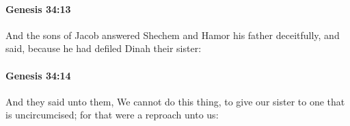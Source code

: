 		\paragraph{Genesis 34:13} %
			\label{GENESIS-34-13}

			And the sons of Jacob answered Shechem and Hamor his father deceitfully, and said, because he had defiled Dinah their sister:


		\paragraph{Genesis 34:14} %
			\label{GENESIS-34-14}

			And they said unto them, We cannot do this thing, to give our sister to one that is uncircumcised; for that were a reproach unto us:


